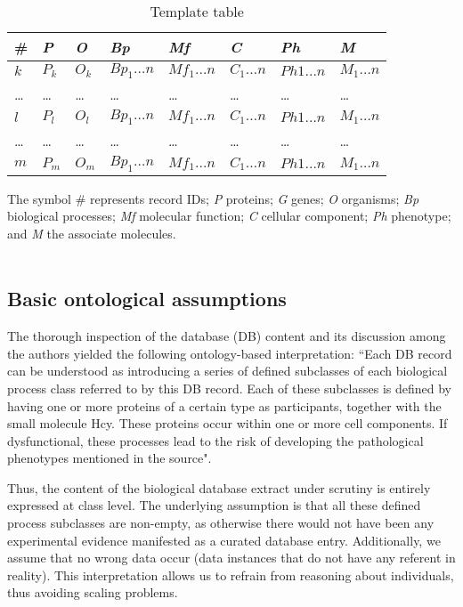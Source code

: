 \begin{table*}[t]
	\centering
	\caption{Template table}
	\label{table:template}
	\begin{tabular}{p{0.3in}p{0.3in}p{0.3in}p{0.6in}p{0.6in}p{0.6in}p{0.6in}p{0.6in}} \hline 
		\# & \textit{P} &\textit{O} & \textit{Bp} & \textit{Mf} & \textit{C} & \textit{Ph} & \textit{M} \\ \hline 
		$k$ & $P_k$ & $O_k$ & $Bp_1\ldots n$ & $Mf_1\ldots n$ & $C_1\ldots n$ & $Ph1\ldots n$ & $M_1\ldots n$ \\
		\ldots & \ldots & \ldots & \ldots & \ldots & \ldots & \ldots & \ldots \\
		$l$ & $P_l$ & $O_l$ & $Bp_1\ldots n$ & $Mf_1\ldots n$ & $C_1\ldots n$ & $Ph1\ldots n$ & $M_1\ldots n$ \\
		\ldots & \ldots & \ldots & \ldots & \ldots & \ldots & \ldots & \ldots \\
		$m$ & $P_m$ & $O_m$ & $Bp_1\ldots n$ & $Mf_1\ldots n$ & $C_1\ldots n$ & $Ph1\ldots n$ & $M_1\ldots n$ \\ \hline 
	\end{tabular}
	\begin{tablenotes}
		\item The symbol \# represents record IDs; \textit{P} proteins; \textit{G} genes; \textit{O} organisms; \textit{Bp} biological processes;
		\textit{Mf} molecular function; \textit{C} cellular component; \textit{Ph} phenotype; and \textit{M} the associate molecules. \\ \\
	\end{tablenotes}
\end{table*}

\subsection{Basic ontological assumptions}
The thorough inspection of the database (DB) content and its discussion among the authors yielded the following ontology-based interpretation: ``Each DB record can be understood as introducing a series of defined subclasses of each biological process class referred to by this DB record. Each of these subclasses is defined by having one or more proteins of a certain type as participants, together with the small molecule Hcy. These proteins occur within one or more cell components. If dysfunctional, these processes lead to the risk of developing the pathological phenotypes mentioned in the source".

Thus, the content of the biological database extract under scrutiny is entirely expressed at class level. The underlying assumption is that all these defined process subclasses are non-empty, as otherwise there would not have been any experimental evidence manifested as a curated database entry. Additionally, we assume that no wrong data occur (data instances that do not have any referent in reality). This interpretation allows us to refrain from reasoning about individuals, thus avoiding scaling problems.  

